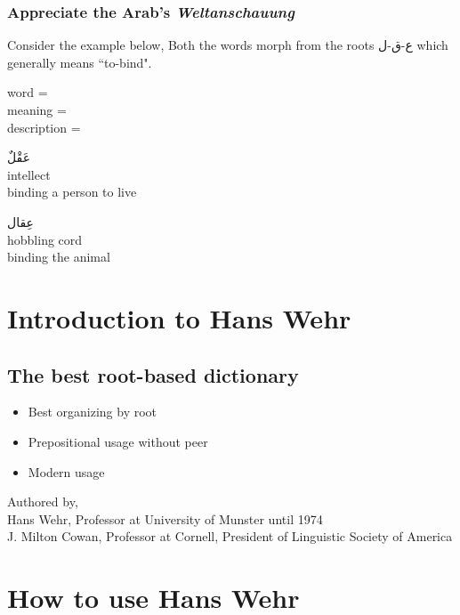 \subsubsection{Appreciate the Arab's \textit{Weltanschauung}}
Consider the example below, Both the words morph from the roots 
\textarabic{ع-ق-ل}
which generally means ``\textarabic{to-bind}". \\


\begin{minipage}{.33\textwidth}
	word = \\ meaning = \\ description =
\end{minipage} 
\begin{minipage}{.33\textwidth}
	\textarabic{عَقْلٌ} \\ intellect \\ binding a person to live
\end{minipage}
\begin{minipage}{.33\textwidth}
	\textarabic{عِقال} \\ hobbling cord \\ binding the animal
\end{minipage}

%


\section{Introduction to Hans Wehr}
\subsection{The best root-based dictionary}
\begin{itemize}	    \setlength{\itemsep}{5pt}
	\item Best organizing by root
	\item Prepositional usage without peer
	\item Modern usage	
\end{itemize}
\noindent Authored by, \\
Hans Wehr, Professor at University of Munster until 1974 \\
J. Milton Cowan, Professor at Cornell, President of Linguistic Society of America

\section{How to use Hans Wehr}
